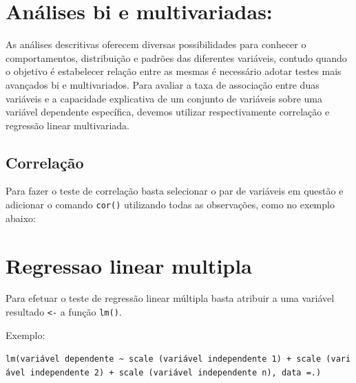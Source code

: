 \documentclass[
  brazil,
]{book}
\newenvironment{Shaded}{\begin{snugshade}}{\end{snugshade}}
\newcommand{\CommentTok}[1]{\textcolor[rgb]{0.56,0.35,0.01}{\textit{#1}}}
\newcommand{\DataTypeTok}[1]{\textcolor[rgb]{0.13,0.29,0.53}{#1}}
\newcommand{\KeywordTok}[1]{\textcolor[rgb]{0.13,0.29,0.53}{\textbf{#1}}}
\newcommand{\NormalTok}[1]{#1}
\newcommand{\OperatorTok}[1]{\textcolor[rgb]{0.81,0.36,0.00}{\textbf{#1}}}
\newcommand{\StringTok}[1]{\textcolor[rgb]{0.31,0.60,0.02}{#1}}
\begin{document}
\hypertarget{anuxe1lises-bi-e-multivariadas}{%
\section{Análises bi e multivariadas:}\label{anuxe1lises-bi-e-multivariadas}}

As análises descritivas oferecem diversas possibilidades para conhecer o comportamentos, distribuição e padrões das diferentes variáveis, contudo quando o objetivo é estabelecer relação entre as mesmas é necessário adotar testes mais avançados bi e multivariados. Para avaliar a taxa de associação entre duas variáveis e a capacidade explicativa de um conjunto de variáveis sobre uma variável dependente específica, devemos utilizar respectivamente correlação e regressão linear multivariada.

\hypertarget{correlauxe7uxe3o}{%
\subsection{Correlação}\label{correlauxe7uxe3o}}

Para fazer o teste de correlação basta selecionar o par de variáveis em questão e adicionar o comando \texttt{cor()} utilizando todas as observações, como no exemplo abaixo:

\begin{Shaded}
\end{Shaded}

\hypertarget{regressao-linear-multipla}{%
\section{Regressao linear multipla}\label{regressao-linear-multipla}}

Para efetuar o teste de regressão linear múltipla basta atribuir a uma variável resultado \texttt{\textless{}-} a função \texttt{lm()}.

Exemplo:

\texttt{lm(variável\ dependente\ \textasciitilde{}\ scale\ (variável\ independente\ 1)\ +\ scale\ (variável\ independente\ 2)\ +\ scale\ (variável\ independente\ n),\ data\ =.)}
\end{document}
